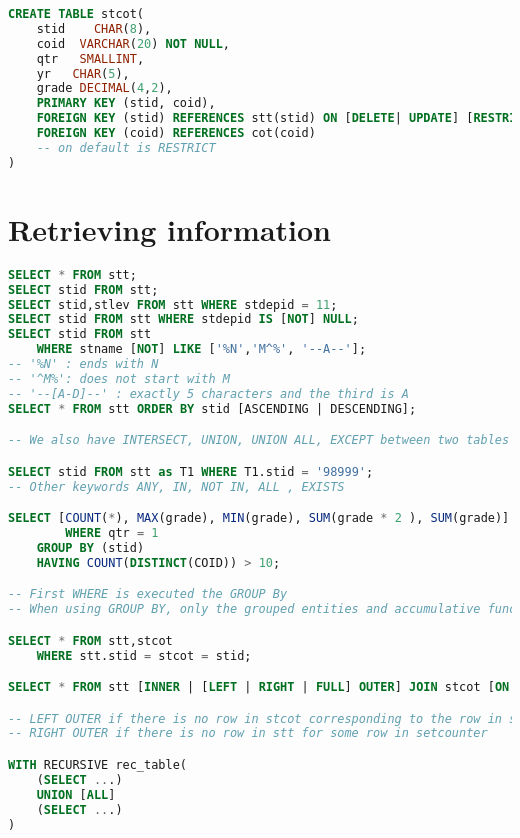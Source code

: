\begin{lstlisting}[language=sql]
CREATE TABLE stcot(
    stid    CHAR(8),
    coid  VARCHAR(20) NOT NULL,
    qtr   SMALLINT,
    yr   CHAR(5),
    grade DECIMAL(4,2),
    PRIMARY KEY (stid, coid),
    FOREIGN KEY (stid) REFERENCES stt(stid) ON [DELETE| UPDATE] [RESTRICT | CASCADE | SET NULL | SET DEFAULT | NO ACTION],
    FOREIGN KEY (coid) REFERENCES cot(coid)
    -- on default is RESTRICT
)
\end{lstlisting}

\section{Retrieving information}
\begin{lstlisting}[language=sql]
SELECT * FROM stt;
SELECT stid FROM stt;
SELECT stid,stlev FROM stt WHERE stdepid = 11;
SELECT stid FROM stt WHERE stdepid IS [NOT] NULL;
SELECT stid FROM stt 
    WHERE stname [NOT] LIKE ['%N','M^%', '--A--'];
-- '%N' : ends with N
-- '^M%': does not start with M
-- '--[A-D]--' : exactly 5 characters and the third is A
SELECT * FROM stt ORDER BY stid [ASCENDING | DESCENDING];

-- We also have INTERSECT, UNION, UNION ALL, EXCEPT between two tables

SELECT stid FROM stt as T1 WHERE T1.stid = '98999';
-- Other keywords ANY, IN, NOT IN, ALL , EXISTS

SELECT [COUNT(*), MAX(grade), MIN(grade), SUM(grade * 2 ), SUM(grade)] FROM stcot
        WHERE qtr = 1
    GROUP BY (stid)
    HAVING COUNT(DISTINCT(COID)) > 10;

-- First WHERE is executed the GROUP By
-- When using GROUP BY, only the grouped entities and accumulative function are allowed to be queried

SELECT * FROM stt,stcot 
    WHERE stt.stid = stcot = stid;

SELECT * FROM stt [INNER | [LEFT | RIGHT | FULL] OUTER] JOIN stcot [ON stt.stid = stcot.stid] [USING(stid)]

-- LEFT OUTER if there is no row in stcot corresponding to the row in stt
-- RIGHT OUTER if there is no row in stt for some row in setcounter

WITH RECURSIVE rec_table(
    (SELECT ...)
    UNION [ALL]
    (SELECT ...)
)
\end{lstlisting}